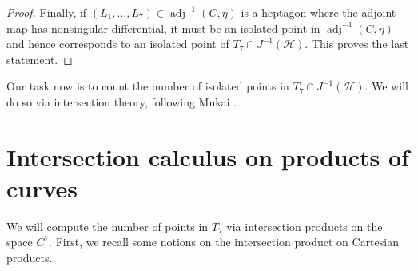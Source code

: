 \documentclass[12pt]{article}
\numberwithin{equation}{section}
\theoremstyle{definition}
\DeclareMathOperator{\adj}{adj}
\begin{document}
\begin{proof}
	 Finally, if $(L_1,\dots,L_7) \in \adj^{-1}(C,\eta)$ is a heptagon where the adjoint map has nonsingular differential, it must be an isolated point in $\adj^{-1}(C,\eta)$ and hence corresponds to an isolated point of $T_7\cap J^{-1}(\mathcal{H})$. This proves the last statement.   
\end{proof}

Our task now is to count the number of isolated points in $T_7\cap J^{-1}(\mathcal{H})$. We will do so via intersection theory, following Mukai \cite{Mukai}.

\section{Intersection calculus on products of curves}\label{sec:intersection}
We will compute the number of points in $T_7$ via intersection products on the space $C^7$. First, we recall some notions on the intersection product on Cartesian products.
\end{document}
